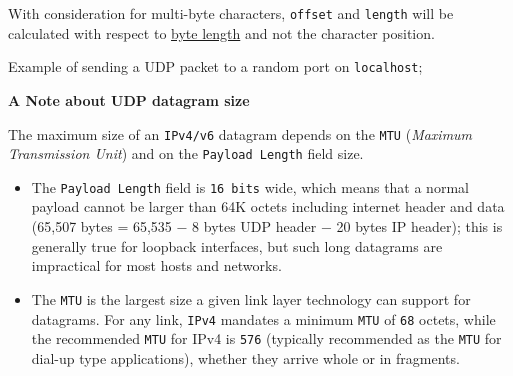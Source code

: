 With consideration for multi-byte characters, \texttt{offset} and
\texttt{length} will be calculated with respect to
\href{buffer.html\#buffer_class_method_buffer_bytelength_string_encoding}{byte
length} and not the character position.

Example of sending a UDP packet to a random port on \texttt{localhost};

\begin{Shaded}
\begin{Highlighting}[]
 \NormalTok{(}\NormalTok{);}
  \NormalTok{(}\NormalTok{);}
 \NormalTok{(}\NormalTok{);}
\NormalTok{, }\NormalTok{, }\NormalTok{, }\NormalTok{, }
  \NormalTok{();}
\NormalTok{\});}
\end{Highlighting}
\end{Shaded}

\textbf{A Note about UDP datagram size}

The maximum size of an \texttt{IPv4/v6} datagram depends on the
\texttt{MTU} (\emph{Maximum Transmission Unit}) and on the
\texttt{Payload\ Length} field size.

\begin{itemize}
\item
  The \texttt{Payload\ Length} field is \texttt{16\ bits} wide, which
  means that a normal payload cannot be larger than 64K octets including
  internet header and data (65,507 bytes = 65,535 − 8 bytes UDP header −
  20 bytes IP header); this is generally true for loopback interfaces,
  but such long datagrams are impractical for most hosts and networks.
\item
  The \texttt{MTU} is the largest size a given link layer technology can
  support for datagrams. For any link, \texttt{IPv4} mandates a minimum
  \texttt{MTU} of \texttt{68} octets, while the recommended \texttt{MTU}
  for IPv4 is \texttt{576} (typically recommended as the \texttt{MTU}
  for dial-up type applications), whether they arrive whole or in
  fragments.
\end{itemize}

